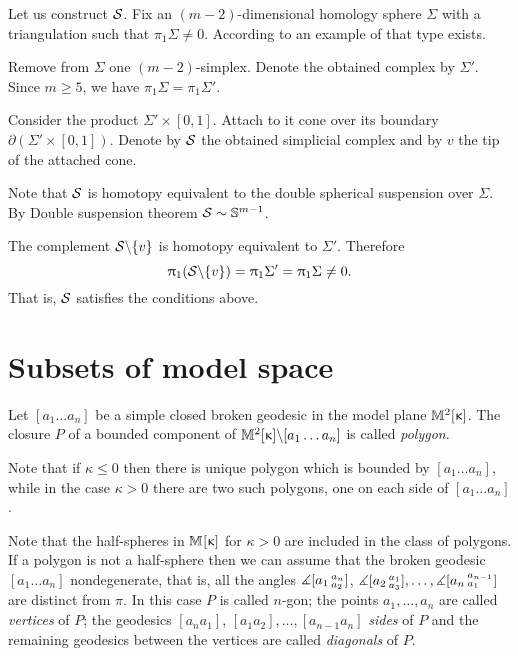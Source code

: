 Let us construct $\mathcal{S}$.
Fix an $(m-2)$-dimensional homology sphere $\Sigma$ with a triangulation such that $\pi_1\Sigma\ne0$.
According to \cite{kervaire} %
an example of that type exists.

Remove from $\Sigma$ one $(m-2)$-simplex.
Denote the obtained complex by $\Sigma'$.
Since $m\ge 5$, we have $\pi_1\Sigma=\pi_1\Sigma'$.

Consider the product $\Sigma'\times [0,1]$. 
Attach to it cone over its boundary $\partial (\Sigma'\times [0,1])$.
Denote by $\mathcal{S}$ the obtained simplicial complex
and by $v$ the tip of the attached cone.

Note that $\mathcal{S}$ is homotopy equivalent to the double spherical suspension over $\Sigma$.
By Double suspension theorem  $\mathcal{S}\sim\mathbb{S}^{m-1}$.

The complement $\mathcal{S}\backslash\{v\}$ is homotopy equivalent to $\Sigma'$.
Therefore 
\[
\uppi_1(\mathcal{S}\backslash\{v\})
=\uppi_1\Sigma'
=\uppi_1\Sigma\ne 0.
\]
That is, $\mathcal{S}$ satisfies the conditions above.
\qeds

\section{Subsets of model space}

Let $[a_1\dots a_n]$
be a simple closed broken geodesic in the model plane $\mathbb{M}_{{}}^{2}[{\upkappa}]$.
The closure $P$ of a bounded component of 
$\Lob{2}{\kappa}\backslash [a_1\dots a_n]$ 
is called \emph{polygon}.

Note that if $\kappa\le 0$ then there is unique polygon which is bounded by $[a_1\dots a_n]$,
while in the case $\kappa> 0$
there are two such polygons,
one on each side of $[a_1\dots a_n]$.

Note that the half-spheres in $\mathbb{M}_{{}}^{}[{\upkappa}]$ for $\kappa>0$ are included in the class of polygons.
If a polygon is not a half-sphere then 
we can assume that the broken geodesic $[a_1\dots a_n]$ nondegenerate, 
that is, all the angles 
$\measuredangle [a_1\,{}^{a_n}_{a_2}]$,
$\mangle \hinge{a_2}{a_1}{a_3},
\dots,
\mangle \hinge{a_{n}}{a_{n-1}}{a_{1}}$ are distinct from $\pi$.
In this case $P$ is called $n$-gon;
the points $a_1,\dots,a_n$ are called \emph{vertices} of $P$;
the geodesics $[a_na_1]$, $[a_1a_2],\dots,[a_{n-1}a_n]$ 
\emph{sides} of $P$
and the remaining geodesics between the vertices are called \emph{diagonals} of $P$. 


